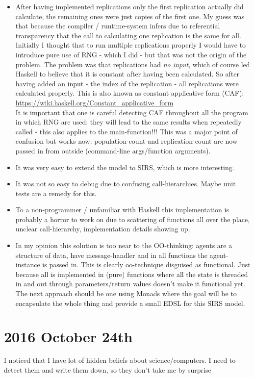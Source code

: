 \begin{itemize}
\item After having implemented replications only the first replication actually did calculate, the remaining ones were just copies of the first one. My guess was that because the compiler / runtime-system infers due to referential transparency that the call to calculating one replication is the same for all. Initially I thought that to run multiple replications properly I would have to introduce pure use of RNG - which I did - but that was not the origin of the problem. The problem was that replications had \textit{no input}, which of course led Haskell to believe that it is constant after having been calculated. So after having added an input - the index of the replication - all replications were calculated properly. This is also known as constant applicative form (CAF): \url{https://wiki.haskell.org/Constant_applicative_form} \\
It is important that one is careful detecting CAF throughout all the program in which RNG are used: they will lead to the same results when repeatedly called - this also applies to the main-function!!! This was a major point of confusion but works now: population-count and replication-count are now passed in from outside (command-line args/function arguments).
\item It was very easy to extend the model to SIRS, which is more interesting.
\item It was not so easy to debug due to confusing call-hierarchies. Maybe unit tests are a remedy for this.
\item To a non-programmer / unfamiliar with Haskell this implementation is probably a horror to work on due to scattering of functions all over the place, unclear call-hierarchy, implementation details showing up.
\item In my opinion this solution is too near to the OO-thinking: agents are a structure of data, have message-handler and in all functions the agent-instance is passed in. This is clearly oo-technique disguised as functional. Just because all is implemented in (pure) functions where all the state is threaded in and out through parameters/return values doesn't make it functional yet. The next approach should be one using Monads where the goal will be to encapsulate the whole thing and provide a small EDSL for this SIRS model.
\end{itemize}

\section*{2016 October 24th}
I noticed that I have lot of hidden beliefs about science/computers. I need to detect them and write them down, so they don't take me by surprise

